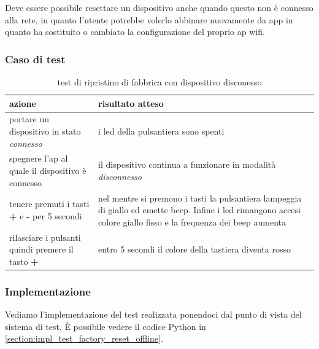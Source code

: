 \documentclass[12pt,a4paper,twoside,titlepage]{book}
\begin{document}
Deve essere possibile resettare un dispositivo anche quando questo non è connesso
alla rete, in quanto l'utente potrebbe volerlo abbinare nuovamente da app in quanto ha sostituito
o cambiato la configurazione del proprio \acrshort{ap} \Gls{wifi}.

\subsubsection{Caso di test}

\begin{table}
    \centering
    \begin{tabular}{| p{} | p{} |}
        \hline
        \textbf{azione} & \textbf{risultato atteso} \\ \hline
        portare un dispositivo in stato \textit{connesso} & i \acrshort{led} della pulsantiera sono spenti \\ \hline
        spegnere l'\acrshort{ap} al quale il dispositivo è connesso & il dispositivo continua a funzionare in modalità \textit{disconnesso} \\ \hline
        tenere premuti i tasti \textbf{+} e \textbf{-} per 5 secondi & nel mentre si premono i tasti la pulsantiera lampeggia di giallo ed emette beep. Infine i \acrshort{led} rimangono accesi colore giallo fisso e la frequenza dei beep aumenta \\ \hline
        rilasciare i pulsanti quindi premere il tasto \textbf{+} & entro 5 secondi il colore della tastiera diventa rosso \\ \hline
    \end{tabular}
    \caption{test di ripristino di fabbrica con dispositivo disconesso}
\end{table}

\subsubsection{Implementazione}
Vediamo l'implementazione del test realizzata ponendoci dal punto di vista del sistema di test. 
È possibile vedere il codice Python in \autoref{section:impl_test_factory_reset_offline}.
\end{document}
